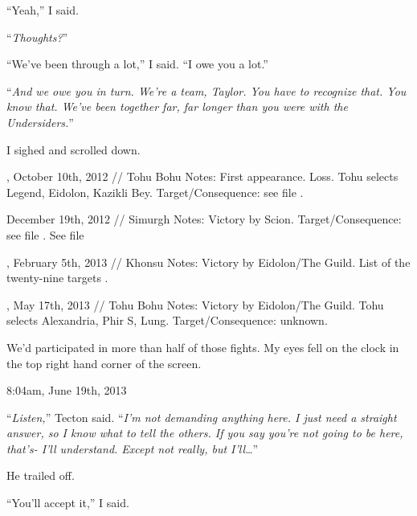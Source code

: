 ``Yeah,'' I said.



``\emph{Thoughts?}''



``We've been through a lot,'' I said.  ``I owe you a lot.''



``\emph{And we owe you in turn.  We're a team, Taylor.  You have to recognize that.  You know that.  We've been together far, far longer than you were with the Undersiders.}''



I sighed and scrolled down.



, October 10th, 2012 // Tohu Bohu
Notes: First appearance.  Loss.  Tohu selects Legend, Eidolon, Kazikli Bey.  Target/Consequence: see file \underline{}.



December 19th, 2012 // Simurgh
Notes: Victory by Scion.
Target/Consequence: see file \underline{}.  See file \underline{}



, February 5th, 2013 // Khonsu
Notes:  Victory by Eidolon/The Guild.  List of the twenty-nine targets \underline{}.



, May 17th, 2013 // Tohu Bohu
Notes: Victory by Eidolon/The Guild.  Tohu selects Alexandria, Phir S, Lung.  Target/Consequence: unknown.



We'd participated in more than half of those fights.  My eyes fell on the clock in the top right hand corner of the screen.



8:04am, June 19th, 2013



``\emph{Listen,}'' Tecton said.  ``\emph{I'm not demanding anything here.  I just need a straight answer, so I know what to tell the others.  If you say you're not going to be here, that's- I'll understand.  Except not really, but I'll\ldots}''



He trailed off.



``You'll accept it,'' I said.



